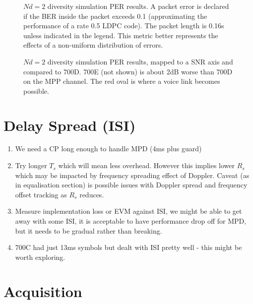 \documentclass{article}
\begin{document}
\begin{figure}[H]
\caption{$Nd=2$ diversity simulation PER results. A packet error is declared if the BER inside the packet exceeds 0.1 (approximating the performance of a rate 0.5 LDPC code). The packet length is 0.16s unless indicated in the legend. This metric better represents the effects of a non-uniform distribution of errors.}
\label{fig:div_per_curves}
\begin{center}

\end{center}
\end{figure}

\begin{figure}[H]
\caption{$Nd=2$ diversity simulation PER results, mapped to a SNR axis and compared to 700D. 700E (not shown) is about 2dB worse than 700D on the MPP channel. The red oval is where a voice link becomes possible.}
\label{fig:snr_per_curves}
\begin{center}

\end{center}
\end{figure}

\section{Delay Spread (ISI)}

\begin{enumerate}
\item We need a CP long enough to handle MPD (4ms plus guard)
\item Try longer $T_s$ which will mean less overhead. However this implies lower $R_s$ which may be impacted by frequency spreading effect of Doppler.  Caveat (as in equalisation section) is possible issues with Doppler spread and frequency offset tracking as $R_s$ reduces.
\item Measure implementation loss or EVM against ISI, we might be able to get away with some ISI, it is acceptable to have performance drop off for MPD, but it needs to be gradual rather than breaking.
\item 700C had just 13ms symbols but dealt with ISI pretty well - this might be worth exploring.
\end{enumerate}

\section{Acquisition}
\end{document}
